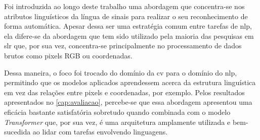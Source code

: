 Foi introduzida ao longo deste trabalho uma abordagem que concentra-se nos atributos linguísticos da língua de sinais para realizar o seu reconhecimento de forma automática.
Apesar dessa ser uma estratégia comum entre tarefas de \acrfull{nlp}, ela difere-se da abordagem que tem sido utilizado pela maioria das pesquisas em \acrfull{slr} que, por sua vez, concentra-se principalmente no processamento de dados brutos como pixels RGB ou coordenadas.

Dessa maneira, o foco foi trocado do domínio da \acrfull{cv} para o domínio do \acrshort{nlp}, permitindo que os modelos aplicados aprendessem acerca da estrutura linguística em vez das relações entre pixels e coordenadas, por exemplo.
Pelos resultados apresentados no \autoref{cap:avaliacao}, percebe-se que essa abordagem apresentou uma eficácia bastante satisfatória sobretudo quando combinada com o modelo \textit{Transformer} que, por sua vez, é uma arquitetura amplamente utilizada e bem-sucedida ao lidar com tarefas envolvendo linguagens.
